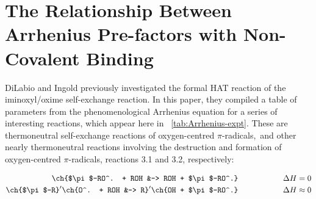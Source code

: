 
\chapter{The Relationship Between Arrhenius Pre-factors with Non-Covalent Binding}
\label{ch:arrhenius}

DiLabio and Ingold\cite{DiLabio2005} previously investigated the formal HAT reaction of the iminoxyl/oxime self-exchange reaction. In this paper, they compiled a table of parameters from the phenomenological Arrhenius equation for a series of interesting reactions, which appear here in ~\ref{tab:Arrhenius-expt}.\cite{Kreilick1966, Mader2004, Mahoney1970, DaRooge1967, Howard1973, Foti1994, Chenier1974, Chenier1975} These are thermoneutral self-exchange reactions of oxygen-centred $\pi$-radicals,\footnotemark~and other nearly thermoneutral reactions involving the destruction and formation of oxygen-centred $\pi$-radicals, reactions 3.1 and 3.2, respectively:

\begin{align}
  \ch{$\pi$-RO^. + ROH &-> ROH + $\pi$-RO^.} \hspace{2cm} \Delta H = 0 \\
  \ch{$\pi$-R}^\prime\ch{O^. + ROH &-> R}^\prime\ch{OH + $\pi$-RO^.} \hspace{2cm} \Delta H \approx 0
\end{align}

\newcommand{\tabFig}[2][0.35]{\texttt{[image: figures/\#2.eps]}}

